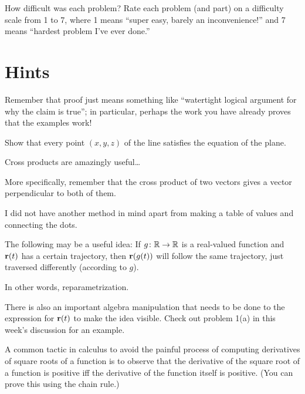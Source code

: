 \begin{problem}
  How difficult was each problem? Rate each problem (and part) on a difficulty scale from 1 to 7, where 1 means ``super easy, barely an inconvenience!'' and 7 means ``hardest problem I've ever done.''
\end{problem}

\newpage

\section{Hints}
\begin{hint}
  Remember that proof just means something like ``watertight logical argument for why the claim is true''; in particular, perhaps the work you have already proves that the examples work!
\end{hint}

\begin{hint}
  Show that every point $(x,y,z)$ of the line satisfies the equation of the plane.
\end{hint}

\begin{hint}
  Cross products are amazingly useful\ldots

  More specifically, remember that the cross product of two vectors gives a vector perpendicular to both of them.
\end{hint}

\begin{hint}
  I did not have another method in mind apart from making a table of values and connecting the dots.
\end{hint}

\begin{hint}
  The following may be a useful idea: If $g\colon\mathbb R\to\mathbb R$ is a real-valued function and $\mathbf r(t)$ has a certain trajectory, then $\mathbf r(g(t))$ will follow the same trajectory, just traversed differently (according to $g$).

  In other words, reparametrization.

  There is also an important algebra manipulation that needs to be done to the expression for $\mathbf r(t)$ to make the idea visible. Check out problem 1(a) in this week's discussion for an example.
\end{hint}

\begin{hint}
  A common tactic in calculus to avoid the painful process of computing derivatives of square roots of a function is to observe that the derivative of the square root of a function is positive iff the derivative of the function itself is positive. (You can prove this using the chain rule.)
\end{hint}

